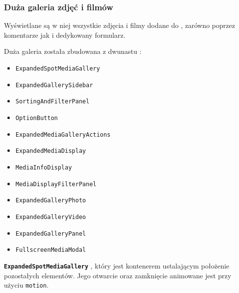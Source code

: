 
\subsubsection{Duża galeria zdjęć i filmów}
\label{subsubsec:duza-galeria-zdjec-i-filmow}

Wyświetlane są w niej wszystkie zdjęcia i filmy dodane do , zarówno poprzez komentarze jak i
dedykowany formularz.

Duża galeria została zbudowana z dwunastu :
\begin{itemize}
    \item \texttt{ExpandedSpotMediaGallery}
    \item \texttt{ExpandedGallerySidebar}
    \item \texttt{SortingAndFilterPanel}
    \item \texttt{OptionButton}
    \item \texttt{ExpandedMediaGalleryActions}
    \item \texttt{ExpandedMediaDisplay}
    \item \texttt{MediaInfoDisplay}
    \item \texttt{MediaDisplayFilterPanel}
    \item \texttt{ExpandedGalleryPhoto}
    \item \texttt{ExpandedGalleryVideo}
    \item \texttt{ExpandedGalleryPanel}
    \item \texttt{FullscreenMediaModal}
\end{itemize}

\textbf{\texttt{ExpandedSpotMediaGallery}}
, który jest kontenerem ustalającym położenie pozostałych elementów.
Jego otwarcie oraz zamknięcie animowane jest przy użyciu  \texttt{motion}.

